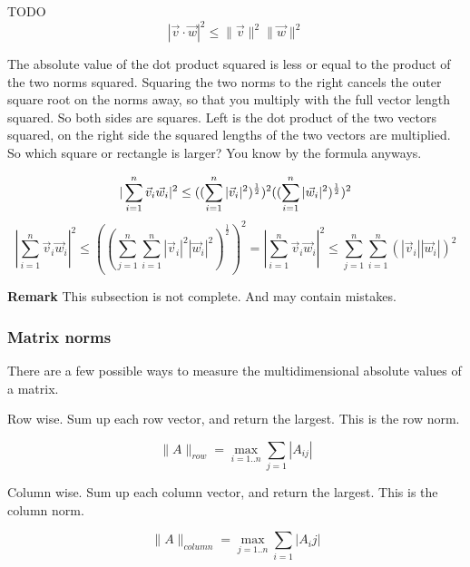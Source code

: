 \documentclass[a4paper]{article}
\begin{document}
TODO\\

\begin{displaymath}
    |\vec{v}\cdot\vec{w}|^{2} \leq \|\vec{v}\|^{2}\|\vec{w}\|^{2}
\end{displaymath}

The absolute value of the dot product squared is less or equal to the product of the two norms squared. Squaring the two norms to the right cancels the outer square root on the norms away, so that you multiply with the full vector length squared. So both sides are squares. Left is the dot product of the two vectors squared, on the right side the squared lengths of the two vectors are multiplied. So which square or rectangle is larger? You know by the formula anyways.

\begin{displaymath}
    |\sum_{i=1}^{n}\vec{v}_{i}\vec{w}_{i}|^{2} \leq ((\sum_{i=1}^{n}|\vec{v}_{i}|^{2})^{\frac{1}{2}})^{2}((\sum_{i=1}^{n}|\vec{w}_{i}|^{2})^{\frac{1}{2}})^{2}\\
\end{displaymath}
\begin{displaymath}
|\sum_{i=1}^{n}\vec{v}_{i}\vec{w}_{i}|^{2} \leq ((\sum_{j=1}^{n}\sum_{i=1}^{n}|\vec{v}_{i}|^{2}|\vec{w}_{i}|^{2})^{\frac{1}{2}})^{2} 
=
|\sum_{i=1}^{n}\vec{v}_{i}\vec{w}_{i}|^{2} \leq \sum_{j=1}^{n}\sum_{i=1}^{n}(|\vec{v}_{i}||\vec{w}_{i}|)^{2}
\end{displaymath}

\textbf{Remark} This subsection is not complete. And may contain mistakes.

\subsubsection{Matrix norms}

There are a few possible ways to measure the multidimensional absolute values of a matrix.

Row wise. Sum up each row vector, and return the largest. This is the row norm.

\begin{displaymath}
\|A\|_{row} = \max_{i=1..n} { \sum_{j=1} |A_{ij}| }
\end{displaymath}

Column wise. Sum up each column vector, and return the largest. This is the column norm.


\begin{displaymath}
\|A\|_{column} = \max_{j=1..n} { \sum_{i=1} |A_{i}j| }
\end{displaymath}
\end{document}
